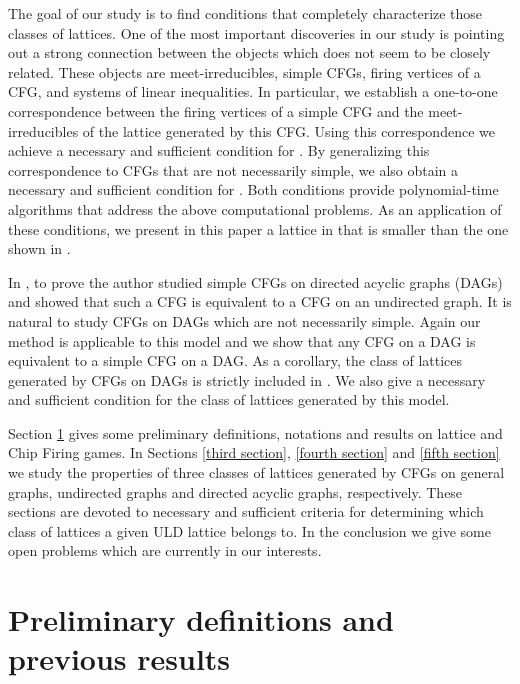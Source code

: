 \documentclass{article}
\theoremstyle{definition}
\begin{document}
The goal of our study is to find conditions that completely characterize those classes of lattices. One of the most important discoveries in our study is pointing out a strong connection  between the objects which does not seem to be closely related. These objects are meet-irreducibles,  simple CFGs, firing vertices of a CFG, and systems of linear inequalities. In particular, we establish a one-to-one correspondence between the firing vertices of a simple CFG and the meet-irreducibles of the lattice generated by this CFG. Using this correspondence we achieve a necessary and sufficient condition for . By generalizing this correspondence to CFGs that are not necessarily simple, we also obtain a necessary and sufficient condition for . Both conditions provide polynomial-time algorithms that address the above computational problems. As an application of these conditions, we present in this paper a lattice in  that is smaller than the one shown in \cite{Mag03}.



In \cite{Mag03}, to prove  the author studied simple CFGs on directed acyclic graphs (DAGs) and showed that such a CFG is equivalent to a CFG on an undirected graph. It is natural to study CFGs on DAGs which are not necessarily simple. Again our method is applicable to this model and we show that any CFG on a DAG is equivalent to a simple CFG on a DAG. As a corollary, the class of lattices generated by CFGs on DAGs is strictly included in . We also give a necessary and sufficient condition for the class of lattices generated by this model.

Section \ref{second section} gives some preliminary definitions, notations and results on lattice and Chip Firing games. In Sections \ref{third section}, \ref{fourth section} and \ref{fifth section} we study the properties of three classes of lattices generated by CFGs on general graphs, undirected graphs and directed acyclic graphs, respectively. These sections are devoted to necessary and sufficient criteria for determining which class of lattices a given ULD lattice belongs to. In the conclusion we give some open problems which are currently in our interests.
\section{Preliminary definitions and previous results}
\label{second section}
\end{document}

